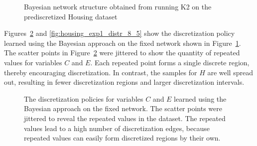 
\begin{figure}[ht]
  \centering
  \scalebox{0.8}{}
  \caption{Bayesian network structure obtained from running K2 on the prediscretized Housing dataset}
  \label{fig:housing_graph_1}
\end{figure}

\begin{table}
  \centering
  \caption{
    Discretization policy summary of the Housing dataset based on the fixed network structure shown.
    The first twelve rows show the numbers of intervals after discretization for each method.
    The last row is the mean cross-validated log-likelihood based on each discretization result.
  }
  
  \label{table:housing_disc_table_1}
\end{table}

Figures~\ref{fig:housing_exp1_distr_3_5} and \ref{fig:housing_exp1_distr_8_5} show the discretization policy learned using the Bayesian approach on the fixed network shown in Figure~\ref{fig:housing_graph_1}.
The scatter points in Figure~\ref{fig:housing_exp1_distr_3_5} were jittered to show the quantity of repeated values for variables $C$ and $E$.
Each repeated point forms a single discrete region, thereby encouraging discretization.
In contrast, the samples for $H$ are well spread out, resulting in fewer discretization regions and larger discretization intervals.

\begin{figure}[ht]
  \centering
  
  \caption{
    The discretization policies for variables $C$ and $E$ learned using the Bayesian approach on the fixed network.
    The scatter points were jittered to reveal the repeated values in the dataset.
    The repeated values lead to a high number of discretization edges, because repeated values can easily form discretized regions by their own.
  }
  \label{fig:housing_exp1_distr_3_5}
\end{figure}

